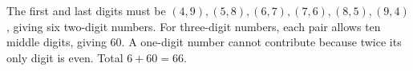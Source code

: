 The first and last digits must be $(4,9),(5,8),(6,7),(7,6),(8,5),(9,4)$, giving six two-digit numbers. For three-digit numbers, each pair allows ten middle digits, giving 60. A one-digit number cannot contribute because twice its only digit is even. Total $6+60=\boxed{66}$.
